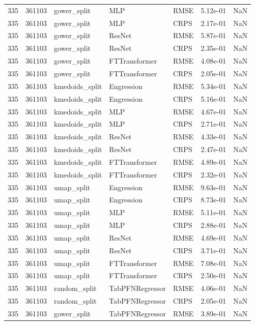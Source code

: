 \begin{tabular}{rrlllrr}
335 & 361103 & gower\_split & MLP & RMSE & 5.12e-01 & NaN \\
335 & 361103 & gower\_split & MLP & CRPS & 2.17e-01 & NaN \\
335 & 361103 & gower\_split & ResNet & RMSE & 5.87e-01 & NaN \\
335 & 361103 & gower\_split & ResNet & CRPS & 2.35e-01 & NaN \\
335 & 361103 & gower\_split & FTTransformer & RMSE & 4.08e-01 & NaN \\
335 & 361103 & gower\_split & FTTransformer & CRPS & 2.05e-01 & NaN \\
335 & 361103 & kmedoids\_split & Engression & RMSE & 5.34e-01 & NaN \\
335 & 361103 & kmedoids\_split & Engression & CRPS & 5.16e-01 & NaN \\
335 & 361103 & kmedoids\_split & MLP & RMSE & 4.67e-01 & NaN \\
335 & 361103 & kmedoids\_split & MLP & CRPS & 2.71e-01 & NaN \\
335 & 361103 & kmedoids\_split & ResNet & RMSE & 4.33e-01 & NaN \\
335 & 361103 & kmedoids\_split & ResNet & CRPS & 2.47e-01 & NaN \\
335 & 361103 & kmedoids\_split & FTTransformer & RMSE & 4.89e-01 & NaN \\
335 & 361103 & kmedoids\_split & FTTransformer & CRPS & 2.32e-01 & NaN \\
335 & 361103 & umap\_split & Engression & RMSE & 9.63e-01 & NaN \\
335 & 361103 & umap\_split & Engression & CRPS & 8.73e-01 & NaN \\
335 & 361103 & umap\_split & MLP & RMSE & 5.11e-01 & NaN \\
335 & 361103 & umap\_split & MLP & CRPS & 2.88e-01 & NaN \\
335 & 361103 & umap\_split & ResNet & RMSE & 4.69e-01 & NaN \\
335 & 361103 & umap\_split & ResNet & CRPS & 3.71e-01 & NaN \\
335 & 361103 & umap\_split & FTTransformer & RMSE & 7.08e-01 & NaN \\
335 & 361103 & umap\_split & FTTransformer & CRPS & 2.50e-01 & NaN \\
335 & 361103 & random\_split & TabPFNRegressor & RMSE & 4.06e-01 & NaN \\
335 & 361103 & random\_split & TabPFNRegressor & CRPS & 2.05e-01 & NaN \\
335 & 361103 & gower\_split & TabPFNRegressor & RMSE & 3.89e-01 & NaN \\

\end{tabular}
